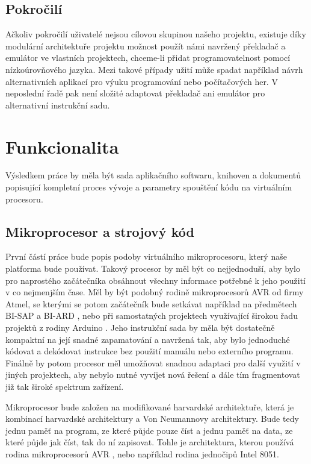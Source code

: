 \subsection{Pokročilí}

Ačkoliv pokročilí uživatelé nejsou cílovou skupinou našeho projektu, existuje díky modulární architektuře projektu možnost použít námi navržený překladač a emulátor ve vlastních projektech, chceme-li přidat programovatelnost pomocí nízkoúrovňového jazyka. Mezi takové případy užití může spadat například návrh alternativních aplikací pro výuku programování nebo počítačových her. V neposlední řadě pak není složité adaptovat překladač ani emulátor pro alternativní instrukční sadu.

\section{Funkcionalita}

Výsledkem práce by měla být sada aplikačního softwaru, knihoven a dokumentů popisující kompletní proces vývoje a parametry spouštění kódu na virtuálním procesoru.

\subsection{Mikroprocesor a strojový kód}

První částí práce bude popis podoby virtuálního mikroprocesoru, který naše platforma bude používat. Takový procesor by měl být co nejjednoduší, aby bylo pro naprostého začátečníka obsáhnout všechny informace potřebné k jeho použití v co nejmenjším čase. Měl by být podobný rodině mikroprocesorů AVR od firmy Atmel, se kterými se potom začátečník bude setkávat například na předmětech BI-SAP a BI-ARD , nebo při samostatných projektech využívající širokou řadu projektů z rodiny Arduino . Jeho instrukční sada by měla být dostatečně kompaktní na její snadné zapamatování a navržená tak, aby bylo jednoduché kódovat a dekódovat instrukce bez použití manuálu nebo externího programu. Finálně by potom procesor měl umožňovat snadnou adaptaci pro další využití v jiných projektech, aby nebylo nutné vyvíjet nová řešení a dále tím fragmentovat již tak široké spektrum zařízení.

Mikroprocesor bude založen na modifikované harvardské architektuře, která je kombinací harvardské architektury a Von Neumannovy architektury.  Bude tedy jednu paměť na program, ze které půjde pouze číst a jednu paměť na data, ze které půjde jak číst, tak do ní zapisovat. Tohle je architektura, kterou používá rodina mikroprocesorů AVR , nebo například rodina jednočipů Intel 8051. 

